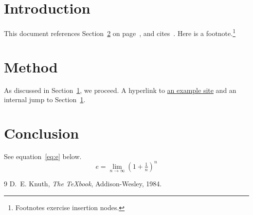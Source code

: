 \documentclass[11pt]{article}
\begin{document}
\tableofcontents

\section{Introduction}\label{sec:intro}
This document references Section~\ref{sec:method} on
page~\pageref{sec:method}, and cites~\cite{knuth1984}.
Here is a footnote.\footnote{Footnotes exercise insertion nodes.}

\section{Method}\label{sec:method}
As discussed in Section~\ref{sec:intro}, we proceed. A hyperlink to
\href{https://example.org}{an example site} and an internal jump to
Section~\ref{sec:intro}.

\section{Conclusion}
See equation~\eqref{eq:e} below.
\begin{equation}\label{eq:e}
  e = \lim_{n\to\infty}\left(1+\tfrac{1}{n}\right)^n
\end{equation}

\begin{thebibliography}{9}
 D.~E. Knuth, \emph{The \TeX book}, Addison-Wesley, 1984.
\end{thebibliography}
\end{document}
